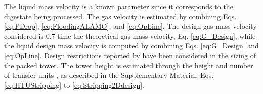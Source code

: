 \begin{refsection}[referencesCh6]
%


The
liquid mass velocity is a known parameter since it corresponds to the digestate being processed. The
gas velocity is estimated by combining Eqs. \ref{eq:PDrop}, \ref{eq:FloodingALAMO}, and \ref{eq:OpLine}. The design gas mass velocity considered is 0.7 time the theoretical gas mass velocity, Eq. \ref{eq:G_Design}, while the liquid design mass velocity is computed by combining Eqs. \ref{eq:G_Design} and \ref{eq:OpLine}.
Design restrictions reported by \citet{Branan} have been considered in the sizing of the packed tower.
The tower height is estimated through the height and number of transfer units \citep{Metcalf}, as described in the Supplementary Material, Eqs. \ref{eq:HTUStripping} to \ref{eq:Stripping2Ddesign}.



\end{refsection}
